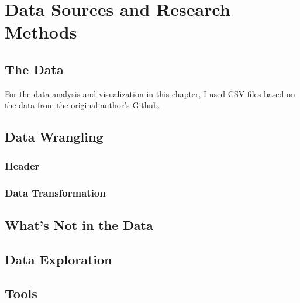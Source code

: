 %
%

\pagebreak
\section{Data Sources and Research Methods}

\onehalfspacing

\subsection{The Data}

For the data analysis and visualization in this chapter, I used CSV files based on the data from the original author's \href{https://github.com/InfraBuilder}{Github}.

\subsection{Data Wrangling}

\subsubsection{Header}

\subsubsection{Data Transformation}

\subsection{What's Not in the Data}

\subsection{Data Exploration}

\subsection{Tools}
